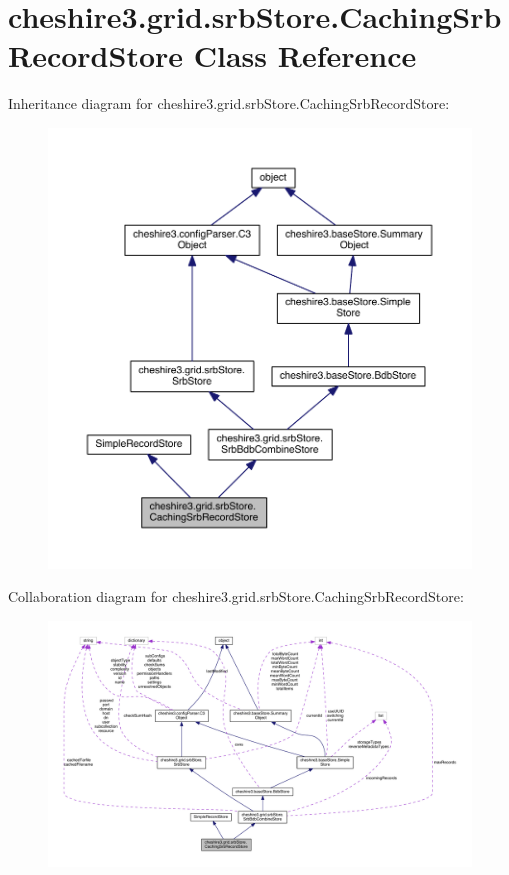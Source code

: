 \hypertarget{classcheshire3_1_1grid_1_1srb_store_1_1_caching_srb_record_store}{\section{cheshire3.\-grid.\-srb\-Store.\-Caching\-Srb\-Record\-Store Class Reference}
\label{classcheshire3_1_1grid_1_1srb_store_1_1_caching_srb_record_store}
}


Inheritance diagram for cheshire3.\-grid.\-srb\-Store.\-Caching\-Srb\-Record\-Store\-:
\nopagebreak
\begin{figure}[H]
\begin{center}
\leavevmode
\includegraphics[width=350pt]{classcheshire3_1_1grid_1_1srb_store_1_1_caching_srb_record_store__inherit__graph}
\end{center}
\end{figure}


Collaboration diagram for cheshire3.\-grid.\-srb\-Store.\-Caching\-Srb\-Record\-Store\-:
\nopagebreak
\begin{figure}[H]
\begin{center}
\leavevmode
\includegraphics[width=350pt]{classcheshire3_1_1grid_1_1srb_store_1_1_caching_srb_record_store__coll__graph}
\end{center}
\end{figure}
